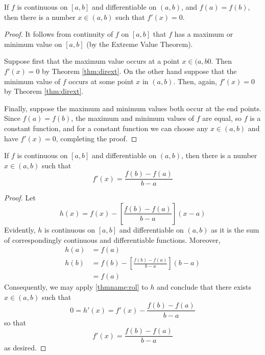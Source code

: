 \documentclass[12pt, a4paper, oneside, openright, titlepage]{book}
\begin{document}
\begin{namthm}\label{thmname:rol}
    If $f$ is continuous on $[a,b]$ and differentiable on $(a,b)$, and $f(a) = f(b)$, then there is a number $x \in (a,b)$ such that $f'(x) = 0$.
\end{namthm}
\begin{proof}
    It follows from continuity of $f$ on $[a,b]$ that $f$ has a maximum or minimum value on $[a,b]$ (by the Extreme Value Theorem).

    Suppose first that the maximum value occurs at a point $x \in (a,b0$. Then $f'(x) = 0$ by Theorem \ref{thm:dirext}. On the other hand suppose that the minimum value of $f$ occurs at some point $x$ in $(a,b)$. Then, again, $f'(x) = 0$ by Theorem \ref{thm:dirext}.

    Finally, suppose the maximum and minimum values both occur at the end points. Since $f(a) = f(b)$, the maximum and minimum values of $f$ are equal, so $f$ is a constant function, and for a constant function we can choose any $x \in (a,b)$ and have $f'(x) = 0$, completing the proof.
\end{proof}


\begin{namthm}\label{thmname:meanval}
    If $f$ is continuous on $[a,b]$ and differentiable on $(a,b)$, then there is a number $x \in (a,b)$ such that \begin{equation}
        f'(x) = \frac{f(b)-f(a)}{b-a} 
    \end{equation}
\end{namthm}
\begin{proof}
    Let \begin{equation*}
        h(x) = f(x) - \left[\frac{f(b) - f(a)}{b-a}\right](x-a)
    \end{equation*}
    Evidently, $h$ is continuous on $[a,b]$ and differentiable on $(a,b)$ as it is the sum of correspondingly continuous and differentiable functions. Moreover, \begin{align*}
        h(a) &= f(a) \\
        h(b) &= f(b) - \left[\frac{f(b) - f(a)}{b-a}\right](b-a) \\
        &= f(a)
    \end{align*}
    Consequently, we may apply \ref{thmname:rol} to $h$ and conclude that there exists $x \in (a,b)$ such that \begin{equation*} 
        0 = h'(x) = f'(x) - \frac{f(b)-f(a)}{b-a}
    \end{equation*}
    so that \begin{equation*}
        f'(x) = \frac{f(b) - f(a)}{b-a}
    \end{equation*}
    as desired.
\end{proof}
\end{document}
